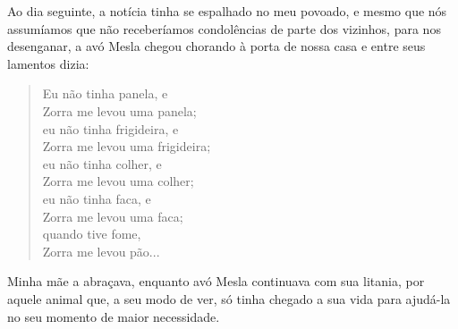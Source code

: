 Ao dia seguinte, a notícia tinha se espalhado no meu povoado, e mesmo que nós assumíamos que não receberíamos condolências de parte dos vizinhos, para nos desenganar, a avó Mesla chegou chorando à porta de nossa casa e entre seus lamentos dizia:
\begin{quotation}
\noindent Eu não tinha panela, e \\Zorra me levou uma panela;\\ 
eu não tinha frigideira, e \\Zorra me levou uma frigideira;\\ 
eu não tinha colher, e \\Zorra me levou uma colher;\\
eu não tinha faca, e \\Zorra me levou uma faca;\\
quando tive fome, \\Zorra me levou pão...  
\end{quotation}
Minha mãe a abraçava, enquanto avó Mesla continuava com sua litania, por aquele animal que, a seu modo de ver, só tinha chegado a sua vida para ajudá-la no seu momento de maior necessidade.
 

